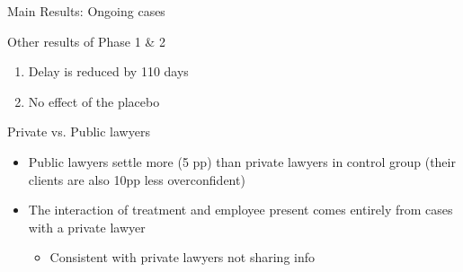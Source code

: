 \documentclass[9pt]{beamer}
\begin{document}
\begin{frame}{Main Results: Ongoing cases}
\begin{enumerate}
\begin{itemize}
	\hyperlink{frame_Table3C}{}
         \end{itemize}
    
    \label{frame_MR_d}
    \end{enumerate}
  \end{frame}
 
 
 
 \begin{frame}{Other results of Phase 1 \& 2}
     \label{otherresults}
     \begin{enumerate}
         \item Delay is reduced by 110 days
        \hyperlink{frameduration}{}
        \vspace{.1in}
        \item No effect of the placebo
     \end{enumerate}
     
 \end{frame}
 
 
 
 
 \begin{frame}{Private vs. Public lawyers}
 \begin{itemize}
     \item \alert{Public lawyers settle more (5 pp)} than private lawyers in control group (their clients are also 10pp less overconfident)
     \pause
     \vspace{.1in}
     \item The interaction of treatment and employee present comes \alert{entirely from cases with a private lawyer}
     \begin{itemize}
         \item Consistent with private lawyers not sharing info
     \end{itemize}
     \pause
 \end{itemize}
 
 \vspace{.1in}
     \begin{table}[H]
    \label{te_bylawyer}
    \begin{center}
     \scriptsize{}
    \end{center}
\end{table}
 \vspace{.2in} 
 \end{frame}
 
\end{document}
